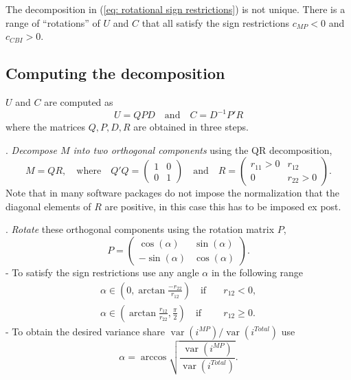\documentclass[a4paper,12pt]{article}
\begin{document}
The decomposition in (\ref{eq: rotational sign restrictions}) is not unique. There is a range of ``rotations'' of $U$ and $C$ that all satisfy the sign restrictions $c_{MP}<0$ and $c_{CBI}>0$. 

\subsection{Computing the decomposition}
$U$ and $C$ are computed as
\begin{equation}
U = QPD \quad \text{and} \quad C = D^{-1}P'R
\end{equation}
where the matrices $Q,P,D,R$ are obtained in three steps.

\bigskip
{}. \emph{Decompose $M$ into two orthogonal components} using the QR decomposition,
\begin{equation}
M = QR,\quad  \text{where}\quad Q'Q=\begin{pmatrix}1&0\\0&1\end{pmatrix}\quad \text{and}\quad
R=\begin{pmatrix}r_{11}>0&r_{12}\\0&r_{22}>0\end{pmatrix}.
\end{equation}
Note that in many software packages do not impose the normalization that the diagonal elements of $R$ are positive, in this case this has to be imposed ex post.

\bigskip
{}. \emph{Rotate} these orthogonal components using the rotation matrix $P$,
\begin{equation} P = \begin{pmatrix}\cos(\alpha)&\sin(\alpha)\\-\sin(\alpha)&\cos(\alpha)\end{pmatrix}.
\end{equation}
- To satisfy the sign restrictions use any angle $\alpha$ in the following range
\begin{subequations}
\begin{align}
\alpha\in\left(0,\arctan\frac{-r_{22}}{r_{12}}\right)\quad\text{if}\quad&r_{12}<0,\label{eq: angle range rhoneg}\\
\alpha\in\left(\arctan\frac{r_{12}}{r_{22}},\frac{\pi}{2}\right)\quad\text{if}\quad&r_{12}\ge0.\label{eq: angle range rhopos}
\end{align}
\end{subequations}
- To obtain the desired variance share $\operatorname{var}(i^{MP})/\operatorname{var}(i^{Total})$ use
\begin{equation}
\alpha = \arccos \sqrt{\frac{\operatorname{var}(i^{MP})}{\operatorname{var}(i^{Total})}}.
\end{equation}
\end{document}
